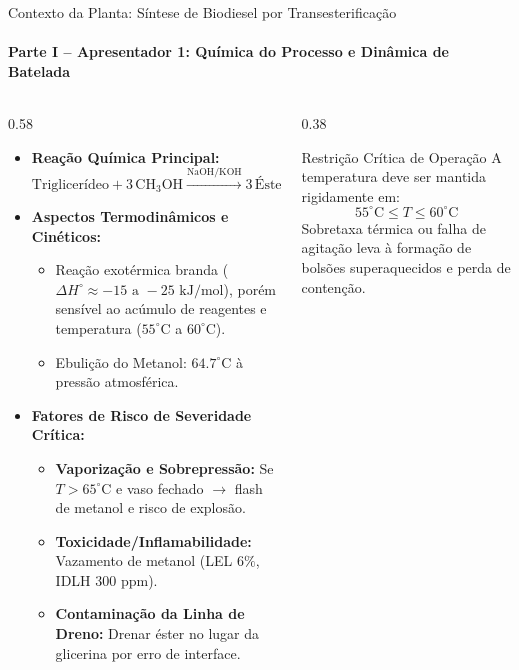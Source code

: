\documentclass[aspectratio=169, 10pt]{beamer}
\begin{document}
\begin{frame}{Contexto da Planta: Síntese de Biodiesel por Transesterificação}
  \framesubtitle{Parte I -- Apresentador 1: Química do Processo e Dinâmica de Batelada}
  \begin{columns}
    \begin{column}{0.58\textwidth}
      \begin{itemize}
        \item \textbf{Reação Química Principal:}
        $$\text{Triglicerídeo} + 3\,\text{CH}_3\text{OH} \xrightarrow{\text{NaOH/KOH}} 3\,\text{Ésteres (Biodiesel)} + \text{Glicerol}$$
        \item \textbf{Aspectos Termodinâmicos e Cinéticos:}
        \begin{itemize}
          \item Reação exotérmica branda ($\Delta H^\circ \approx -15\text{ a }-25\text{ kJ/mol}$), porém sensível ao acúmulo de reagentes e temperatura ($55^\circ\text{C}$ a $60^\circ\text{C}$).
          \item Ebulição do Metanol: $64.7^\circ\text{C}$ à pressão atmosférica.
        \end{itemize}
        \item \textbf{Fatores de Risco de Severidade Crítica:}
        \begin{itemize}
          \item \textcolor{alertred}{\textbf{Vaporização e Sobrepressão:}} Se $T > 65^\circ\text{C}$ e vaso fechado $\to$ flash de metanol e risco de explosão.
          \item \textcolor{alertred}{\textbf{Toxicidade/Inflamabilidade:}} Vazamento de metanol (LEL $6\%$, IDLH $300\text{ ppm}$).
          \item \textcolor{alertred}{\textbf{Contaminação da Linha de Dreno:}} Drenar éster no lugar da glicerina por erro de interface.
        \end{itemize}
      \end{itemize}
    \end{column}
    \begin{column}{0.38\textwidth}
      \begin{alertblock}{Restrição Crítica de Operação}
        A temperatura deve ser mantida rigidamente em:
        $$55^\circ\text{C} \le T \le 60^\circ\text{C}$$
        Sobretaxa térmica ou falha de agitação leva à formação de bolsões superaquecidos e perda de contenção.
      \end{alertblock}
    \end{column}
  \end{columns}
\end{frame}
\end{document}
